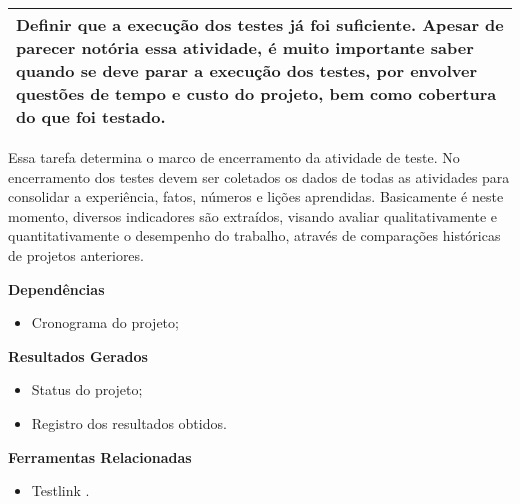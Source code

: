 \begin{table}[!ht]
\centering
\begin{tabular}{|p{130mm}|}
\hline
Definir que a execução dos testes já foi suficiente. Apesar de parecer notória essa atividade, é muito importante saber quando se deve parar a execução dos testes, por envolver questões de tempo e custo do   projeto, bem como cobertura do que foi testado. \\ 
\hline
\end{tabular}
\end{table}

Essa tarefa determina o marco de encerramento da atividade de teste. No encerramento dos testes devem ser coletados os dados de todas as atividades para consolidar a experiência, fatos, números e lições aprendidas. Basicamente é neste momento, diversos indicadores são extraídos, visando avaliar qualitativamente e quantitativamente o desempenho do trabalho, através de comparações históricas de projetos anteriores.

\textbf{Dependências}
\begin{itemize}
    \item Cronograma do projeto;
\end{itemize}

\textbf{Resultados Gerados}
\begin{itemize}
    \item Status do projeto;
    \item Registro dos resultados obtidos.
\end{itemize}

\textbf{Ferramentas Relacionadas}
\begin{itemize}
    \item Testlink \cite{TestLink}.
\end{itemize}



